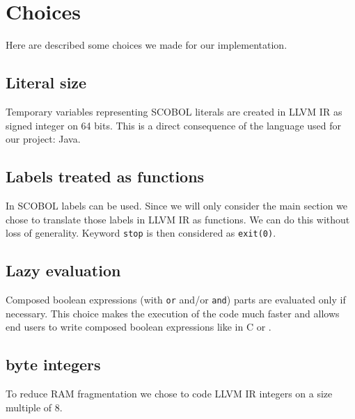 \newpage\cleardoublepage{}
\section{Choices}

Here are described some choices we made for our implementation.


\subsection{Literal size}

Temporary variables representing SCOBOL literals are created in LLVM IR as signed integer on 64 bits. This is a direct consequence of the language used for our project: Java.


\subsection{Labels treated as functions}

In SCOBOL labels can be used. Since we will only consider the main section we chose to translate those labels in LLVM IR as functions. We can do this without loss of generality. Keyword \verb!stop! is then considered as \verb!exit(0)!.

\subsection{Lazy evaluation}

Composed boolean expressions (with \verb!or! and/or \verb!and!) parts are evaluated only if necessary. This choice makes the execution of the code much faster and allows end users to write composed boolean expressions like in C or \CXX.

\subsection{byte integers}

To reduce RAM fragmentation we chose to code LLVM IR integers on a size multiple of 8.



